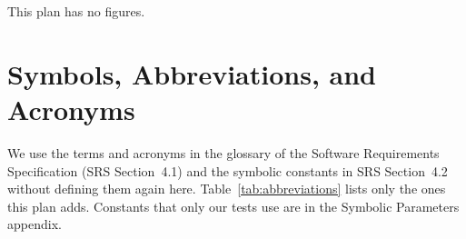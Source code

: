 \documentclass[12pt, titlepage]{article}
\begin{document}
\newpage

\tableofcontents

\listoftables

\listoffigures

\noindent This plan has no figures.

\newpage

\section{Symbols, Abbreviations, and Acronyms}
\label{sec:abbreviations}

We use the terms and acronyms in the glossary of the Software Requirements
Specification (SRS Section~4.1) and the symbolic constants in SRS Section~4.2
without defining them again here.
Table~\ref{tab:abbreviations} lists only the ones this plan adds. Constants
that only our tests use are in the Symbolic Parameters appendix.
\end{document}
